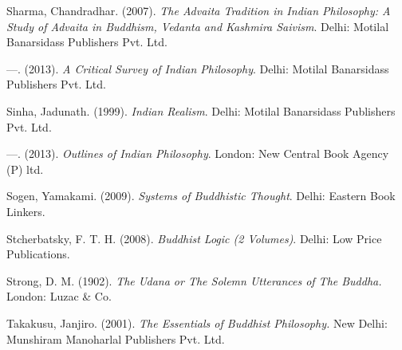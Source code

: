 \begin{thebibliography}{99}
  Sharma, Chandradhar. (2007). \textit{The Advaita Tradition in Indian Philosophy: A Study of Advaita in Buddhism, Vedanta and Kashmira Saivism}. Delhi: Motilal Banarsidass Publishers Pvt. Ltd.

  —. (2013). \textit{A Critical Survey of Indian Philosophy}. Delhi: Motilal Banarsidass Publishers Pvt. Ltd.

  Sinha, Jadunath. (1999). \textit{Indian Realism}. Delhi: Motilal Banarsidass Publishers Pvt. Ltd.

  —. (2013). \textit{Outlines of Indian Philosophy}. London: New Central Book Agency (P) ltd.

  Sogen, Yamakami. (2009). \textit{Systems of Buddhistic Thought}. Delhi: Eastern Book Linkers.

  Stcherbatsky, F. T. H. (2008). \textit{Buddhist Logic (2 Volumes)}. Delhi: Low Price Publications.

  Strong, D. M. (1902). \textit{The Udana or The Solemn Utterances of The Buddha.} London: Luzac \& Co.

  Takakusu, Janjiro. (2001). \textit{The Essentials of Buddhist Philosophy.} New Delhi: Munshiram Manoharlal Publishers Pvt. Ltd.
 
 \end{thebibliography}

\theendnotes

\label{chapter4-end}

